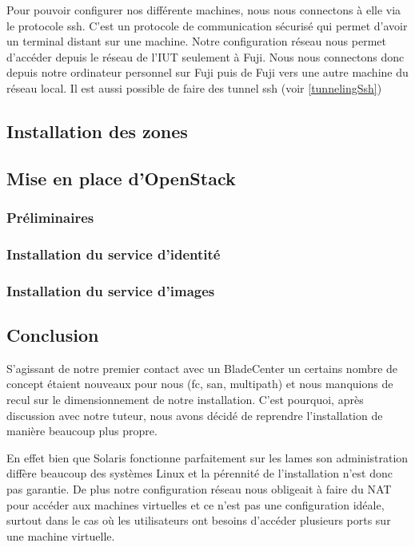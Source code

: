 \documentclass[a4paper,oneside]{report}
\begin{document}
Pour pouvoir configurer nos différente machines, nous nous connectons à elle via le protocole \gls{ssh}. 
C'est un protocole de communication sécurisé qui permet d'avoir un terminal distant sur une machine.
Notre configuration réseau nous permet d'accéder depuis le réseau de l'IUT seulement à Fuji.
Nous nous connectons donc depuis notre ordinateur personnel sur Fuji puis de Fuji vers une autre machine du réseau local.
Il est aussi possible de faire des tunnel \gls{ssh} (voir \ref{tunnelingSsh})

\subsection{Installation des zones}

\subsection{Mise en place d'OpenStack}
\subsubsection{Préliminaires}

\subsubsection{Installation du service d'identité}

\subsubsection{Installation du service d'images}

\subsection{Conclusion}
S'agissant de notre premier contact avec un BladeCenter un certains nombre de concept étaient nouveaux pour nous (\gls{fc}, \gls{san}, multipath) et nous manquions de recul sur le dimensionnement de notre installation.
C'est pourquoi, après discussion avec notre tuteur, nous avons décidé de reprendre l'installation de manière beaucoup plus propre.

En effet bien que Solaris fonctionne parfaitement sur les lames son administration diffère beaucoup des systèmes Linux et la pérennité de l'installation n'est donc pas garantie.\newline
De plus notre configuration réseau nous obligeait à faire du NAT pour accéder aux machines virtuelles et ce n'est pas une configuration idéale, surtout dans le cas où les utilisateurs ont besoins d'accéder plusieurs ports sur une machine virtuelle.
\end{document}
